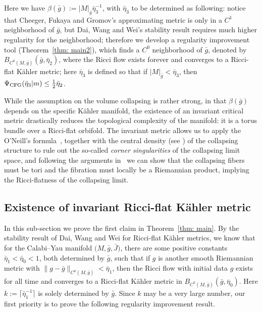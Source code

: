 \documentclass[10pt,a4paper]{amsart}
\numberwithin{equation}{section}
\begin{document}
Here we have $\beta(\bar{g}):=|M|_{\bar{g}}\bar{\eta}_3^{-1}$, with
$\bar{\eta}_3$ to be determined as following: notice that Cheeger, Fukaya and
Gromov's approximating metric is only in a $C^1$ neighborhood of $\bar{g}$, but
Dai, Wang and Wei's stability result requires much higher regularity for the
neighborhood; therefore we develop a regularity improvement tool
(Theorem~\ref{thm: main2}), which finds a $C^0$ neighborhood of $\bar{g}$,
denoted by $B_{C^0(M,\bar{g})}(\bar{g}, \bar{\eta}_2)$, where the Ricci flow
exists forever and converges to a Ricci-flat K\"ahler metric; here
$\bar{\eta}_3$ is defined so that if $|M|_{\bar{g}}<\bar{\eta}_3$, then
$\Psi_{\rm CFG}(\bar{\eta}_3|m)\le \frac{1}{2}\bar{\eta}_2$.

While the assumption on the volume collapsing is rather strong, in that
$\beta(\bar{g})$ depends on the specific K\"ahler manifold, the
existence of an invariant critical metric drastically reduces the topological
complexity of the manifold: it is a torus bundle over a Ricci-flat orbifold. The
invariant metric allows us to apply the O'Neill's formula~\cite{ONeill},
together with the central density (see \cite[Section~5]{Foxy1908}) of the collapsing
structure to rule out the so-called \emph{corner singularities} of the
collapsing limit space, and following the arguments in~\cite{Lott10, NT18}
we can show that the collapsing fibers must be tori and the fibration must
locally be a Riemannian product, implying the Ricci-flatness of the collapsing
limit.

\subsection{Existence of invariant Ricci-flat K\"ahler metric}\label{section5.1}
In this sub-section we prove the first claim in Theorem~\ref{thm: main}.
By the stability result \cite{DWW07} of Dai, Wang and Wei for Ricci-flat
K\"ahler metrics, we know that for the Calabi--Yau manifold $\big(M,\bar{g},
\bar{J}\big)$, there are some positive constants $\bar{\eta}_1
<\bar{\eta}_0<1$, both determined by $\bar{g}$, such that if $g$ is
another smooth Riemannian metric with $ \|g-
\bar{g} \|_{C^k(M,\bar{g})} <\bar{\eta}_1$, then the
Ricci flow with initial data $g$ exists for all time and converges to a
Ricci-flat K\"ahler metric in $B_{C^k(M,\bar{g})}(\bar{g},
\bar{\eta}_0)$. Here $k:=\big\lceil \bar{\eta}_1^{-1}
\big\rceil$ is solely determined by $\bar{g}$. Since $k$ may be a very large
number, our first priority is to prove the following regularity improvement
result.
\end{document}
